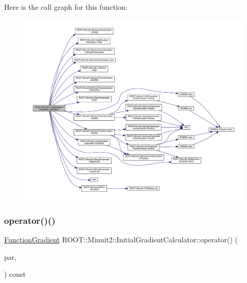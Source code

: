 Here is the call graph for this function\+:\nopagebreak
\begin{figure}[H]
\begin{center}
\leavevmode
\includegraphics[width=350pt]{d3/dcf/classROOT_1_1Minuit2_1_1InitialGradientCalculator_afae3b02315c3ed44cdd94dff4bd53462_cgraph}
\end{center}
\end{figure}
\mbox{\label{classROOT_1_1Minuit2_1_1InitialGradientCalculator_aca07af1a7ff9e8525c0d4d2d3633f9c5}} 
\subsubsection{\texorpdfstring{operator()()}{operator()()}\hspace{0.1cm}{\footnotesize\ttfamily [3/4]}}
{\footnotesize\ttfamily \mbox{\hyperlink{classROOT_1_1Minuit2_1_1FunctionGradient}{Function\+Gradient}} R\+O\+O\+T\+::\+Minuit2\+::\+Initial\+Gradient\+Calculator\+::operator() (\begin{DoxyParamCaption}\item[{const \mbox{\hyperlink{classROOT_1_1Minuit2_1_1MinimumParameters}{Minimum\+Parameters}} \&}]{par,  }\item[{const \mbox{\hyperlink{classROOT_1_1Minuit2_1_1FunctionGradient}{Function\+Gradient}} \&}]{ }\end{DoxyParamCaption}) const\hspace{0.3cm}{\ttfamily [virtual]}}



